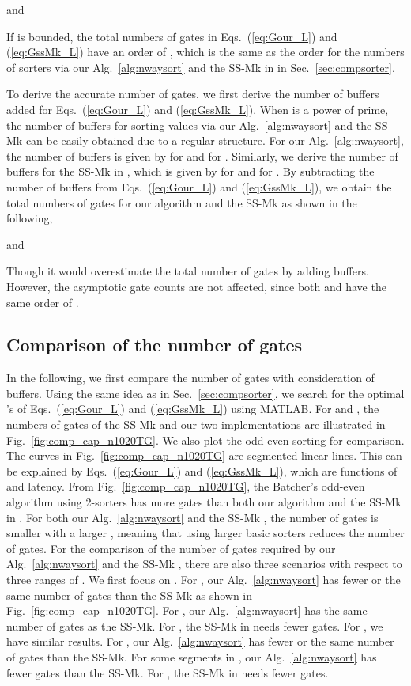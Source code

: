 \documentclass[10pt,journal,cspaper,compsoc]{IEEEtran}
\begin{document}
and

If  is bounded, the total numbers of gates in Eqs.~(\ref{eq:Gour_L}) and (\ref{eq:GssMk_L}) have an order of , which is the same as the order for the numbers of sorters via our Alg.~\ref{alg:nwaysort} and the SS-Mk in \cite{gao1997sloping} in Sec.~\ref{sec:compsorter}.

To derive the accurate number of gates, we first derive the number of buffers added for Eqs.~(\ref{eq:Gour_L}) and (\ref{eq:GssMk_L}).
When  is a power of prime, the number of buffers for sorting  values via our Alg.~\ref{alg:nwaysort} and the SS-Mk \cite{gao1997sloping} can be easily obtained due to a regular structure.
For our Alg.~\ref{alg:nwaysort}, the number of buffers is given by  for  and  for . Similarly, we derive the number of buffers for the SS-Mk in \cite{gao1997sloping}, which is given by  for  and  for .
By subtracting the number of buffers from Eqs.~(\ref{eq:Gour_L}) and (\ref{eq:GssMk_L}), we obtain the total numbers of gates for our algorithm and the SS-Mk as shown in the following,

and

Though it would overestimate the total number of gates by adding buffers. However, the asymptotic gate counts are not affected, since both  and  have the same order of .

\subsection{Comparison of the number of gates}
In the following, we first compare the number of gates with consideration of buffers.
Using the same idea as in Sec.~\ref{sec:compsorter}, we search for the optimal 's of Eqs.~(\ref{eq:Gour_L}) and (\ref{eq:GssMk_L}) using MATLAB.
For  and , the numbers of gates of the SS-Mk and our two implementations are illustrated in Fig.~\ref{fig:comp_cap_n1020TG}. We also plot the odd-even sorting for comparison.
The curves in Fig.~\ref{fig:comp_cap_n1020TG} are segmented linear lines. This can be explained by Eqs.~(\ref{eq:Gour_L}) and (\ref{eq:GssMk_L}), which are functions of  and latency.
From Fig.~\ref{fig:comp_cap_n1020TG}, the Batcher's odd-even algorithm using 2-sorters has more gates than both our algorithm and the SS-Mk in \cite{gao1997sloping}.
For both our Alg.~\ref{alg:nwaysort} and the SS-Mk \cite{gao1997sloping}, the number of gates  is smaller with a larger , meaning that using larger basic sorters reduces the number of gates.
For the comparison of the number of gates required by our Alg.~\ref{alg:nwaysort} and the SS-Mk \cite{gao1997sloping}, there are also three scenarios with respect to three ranges of .
We first focus on . For , our Alg.~\ref{alg:nwaysort} has fewer or the same number of gates than the SS-Mk as shown in Fig.~\ref{fig:comp_cap_n1020TG}. For , our Alg.~\ref{alg:nwaysort} has the same number of gates as the SS-Mk. For , the SS-Mk in \cite{gao1997sloping} needs fewer gates.
For , we have similar results.
For , our Alg.~\ref{alg:nwaysort} has fewer or the same number of gates than the SS-Mk. For some segments in , our Alg.~\ref{alg:nwaysort} has fewer gates than the SS-Mk. For , the SS-Mk in \cite{gao1997sloping} needs fewer gates.
\end{document}
